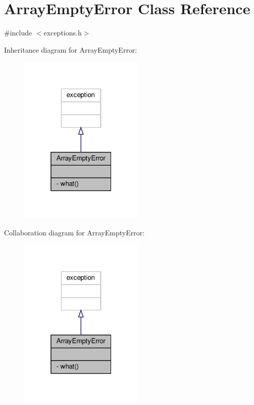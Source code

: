 \hypertarget{classArrayEmptyError}{}\section{Array\+Empty\+Error Class Reference}
\label{classArrayEmptyError}


{\ttfamily \#include $<$exceptions.\+h$>$}



Inheritance diagram for Array\+Empty\+Error\+:\nopagebreak
\begin{figure}[H]
\begin{center}
\leavevmode
\includegraphics[width=169pt]{classArrayEmptyError__inherit__graph}
\end{center}
\end{figure}


Collaboration diagram for Array\+Empty\+Error\+:\nopagebreak
\begin{figure}[H]
\begin{center}
\leavevmode
\includegraphics[width=169pt]{classArrayEmptyError__coll__graph}
\end{center}
\end{figure}
